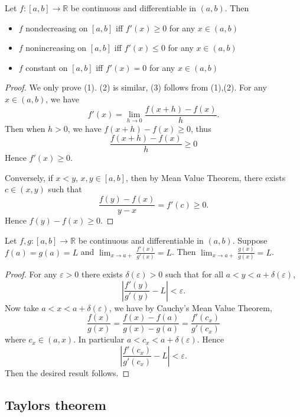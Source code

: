 
\begin{proposition}
	Let $f:[a,b] \to \mathbb{R}$ be continuous and differentiable in $(a,b)$. Then
	\begin{itemize}
		\item $f$ nondecreasing on $[a,b]$ iff $f'(x) \ge 0$ for any $x \in (a,b) $
		\item $f$ nonincreasing on $[a,b]$ iff $f'(x) \le 0$ for any $x \in (a,b) $
		\item $f$ constant on $[a,b]$ iff $f'(x) = 0$ for any $x \in (a,b) $
	\end{itemize}
\end{proposition}
\begin{proof}
	We only prove (1). (2) is similar, (3) follows from (1),(2). For any $x \in (a,b)$, we have \[
		f'(x) = \lim_{h \to 0} \frac{f(x+h)-f(x)}{h}
	.\] 
	Then when  $h>0$, we have $f(x+h) - f(x) \ge 0$, thus \[
		\frac{f(x+h) - f(x)}{h} \ge 0
	\]
	Hence $f'(x)\ge 0$.

	Conversely, if $x<y$, $x,y \in [a,b]$, then by Mean Value Theorem, there exists $c \in (x,y)$ such that
	\[
		\frac{f(y) - f(x)}{y-x } = f'(c) \ge 0
	.\] 
	Hence $f(y) - f(x) \ge 0$.
\end{proof}

\begin{proposition}
	Let $f,g: [a,b]\to \mathbb{R}$ be continuous and differentiable in $(a,b)$. Suppose $f(a) = g(a) = L$ and $\lim_{x \to a+} \frac{f'(x)}{g'(x)} = L$. Then $\lim_{x \to a+} \frac{g(x)}{g(x)} = L$.
\end{proposition}
\begin{proof}
	For any $\varepsilon>0$ there exists $\delta(\varepsilon)>0$ such that for all $a<y<a+\delta(\varepsilon)$, 
	\[
		\left| \frac{f'(y)}{g'(y)} - L \right| < \varepsilon
	.\] 
	Now take $a < x < a+\delta(\varepsilon)$, we have by Cauchy's Mean Value Theorem,
	\[
		\frac{f(x)}{g(x)} = \frac{f(x) - f(a)}{g(x) - g(a)} = \frac{f'(c_x)}{g'(c_x)}
	\] 
	where $c_x \in (a,x)$. In particular $a < c_x < a+\delta(\varepsilon)$. Hence
	\[
		\left| \frac{f'(c_x)}{g'(c_x)} - L \right| < \varepsilon
	.\] 
	Then the desired result follows.
\end{proof}

\subsection{Taylors theorem}

